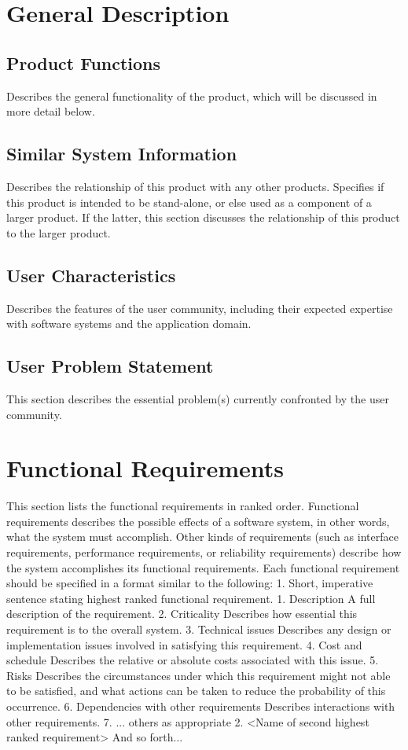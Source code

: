 \documentclass[]{article}
\begin{document}
\section{General Description}

\subsection{Product Functions}
Describes the general functionality of the product, which will be discussed in more detail below. 

\subsection{Similar System Information}
Describes the relationship of this product with any other products. Specifies if this product is intended to be stand-alone, or else used as a component of a larger product. If the latter, this section discusses the relationship of this product to the larger product. 

\subsection{ User Characteristics}
Describes the features of the user community, including their expected expertise with software systems and the application domain. 

\subsection{ User Problem Statement}
This section describes the essential problem(s) currently confronted by the user community. 

\section{Functional Requirements}
This section lists the functional requirements in ranked order. Functional requirements describes the possible effects of a software system, in other words, what the system must accomplish. Other kinds of requirements (such as interface requirements, performance requirements, or reliability requirements) describe how the system accomplishes its functional requirements. Each functional requirement should be specified in a format similar to the following: 
1.	Short, imperative sentence stating highest ranked functional requirement.
1.	Description
A full description of the requirement. 
2.	Criticality
Describes how essential this requirement is to the overall system. 
3.	Technical issues
Describes any design or implementation issues involved in satisfying this requirement. 
4.	Cost and schedule
Describes the relative or absolute costs associated with this issue. 
5.	Risks
Describes the circumstances under which this requirement might not able to be satisfied, and what actions can be taken to reduce the probability of this occurrence. 
6.	Dependencies with other requirements
Describes interactions with other requirements. 
7.	... others as appropriate
2.	<Name of second highest ranked requirement>
And so forth... 
\end{document}
